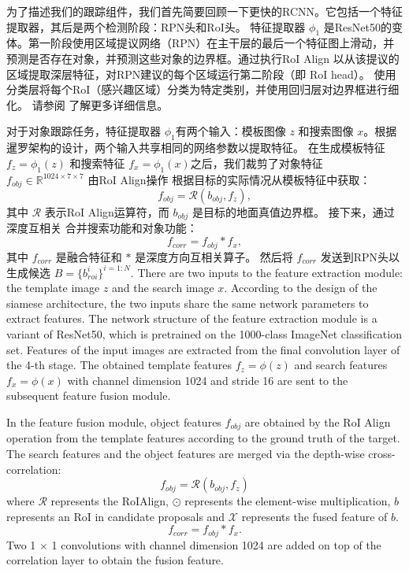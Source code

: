 为了描述我们的跟踪组件，我们首先简要回顾一下更快的RCNN。它包括一个特征提取器，其后是两个检测阶段：RPN头和RoI头。
特征提取器 $\phi_{1}$ 是ResNet50的变体。第一阶段使用区域提议网络（RPN）在主干层的最后一个特征图上滑动，并预测是否存在对象，并预测这些对象的边界框。通过执行RoI Align \cite{He2018MaskR} 以从该提议的区域提取深层特征，对RPN建议的每个区域运行第二阶段（即 RoI head）。
使用分类层将每个RoI（感兴趣区域）分类为特定类别，并使用回归层对边界框进行细化。
请参阅 \cite{ren2015faster} 了解更多详细信息。

对于对象跟踪任务，特征提取器 $\phi_{1}$有两个输入：模板图像 $z$ 和搜索图像 $x$。根据暹罗架构的设计，两个输入共享相同的网络参数以提取特征。
在生成模板特征 $f_{z} = \phi_{1}(z)$ 和搜索特征 $f_{x} = \phi_{1}(x)$之后，我们裁剪了对象特征 $f_{obj} \in \mathbb{R}^{1024 \times 7 \times 7}$ 由RoI Align操作 \cite{He2018MaskR} 根据目标的实际情况从模板特征中获取：
\begin{equation}
    f_{obj} = \mathcal{R}(b_{obj}, f_{z}),
\end{equation}
其中 $\mathcal{R}$ 表示RoI Align运算符，而 $b_{obj}$ 是目标的地面真值边界框。
接下来，通过深度互相关 \cite{SiamRPN++} 合并搜索功能和对象功能：
\begin{equation}
    f_{corr} = f_{obj} * f_{x},
\end{equation}
其中 $f_{corr}$ 是融合特征和 $*$ 是深度方向互相关算子。
然后将 $f_{corr}$ 发送到RPN头以生成候选 $B=\{b^{i}_{roi}\}^{i=1:N}$.
\iffalse
There are two inputs to the feature extraction module: the template image $z$ and the search image $x$. According to the design of the siamese architecture, the two inputs share the same network parameters to extract features.
The network structure of the feature extraction module is a variant of ResNet50, which is pretrained on the 1000-class ImageNet classification set. Features of the input images are extracted from the final convolution layer of the 4-th stage. The obtained template features $f_{z} = \phi(z)$ and search features $f_{x} = \phi(x)$ with channel dimension 1024 and stride 16 are sent to the subsequent feature fusion module.

In the feature fusion module, object features $f_{obj}$ are obtained by the RoI Align operation from the template features according to the ground truth of the target. The search features and the object features are merged via the depth-wise cross-correlation:
\begin{equation}
    f_{obj} = \mathcal{R}(b_{obj}, f_{z})
\end{equation}
where $\mathcal{R}$ represents the RoIAlign, $\odot$ represents the element-wise multiplication, $b$ represents an RoI in candidate proposals and $\mathcal{X}$ represents the fused feature of $b$.
\begin{equation}
    f_{corr} = f_{obj} * f_{x}.
\end{equation}
Two 1 $\times$ 1 convolutions with channel dimension 1024 are added on top of the correlation layer to obtain the fusion feature.

